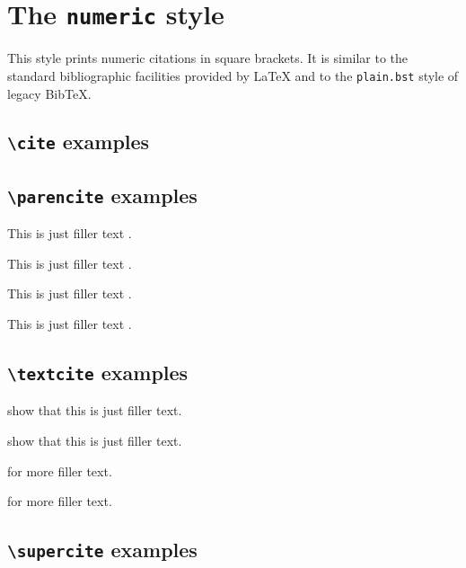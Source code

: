 \documentclass[a4paper]{article}
\newcommand{\cmd}[1]{\texttt{\textbackslash #1}}
\begin{document}
\section*{The \texttt{numeric} style}

This style prints numeric citations in square brackets. It is
similar to the standard bibliographic facilities provided by LaTeX
and to the \texttt{plain.bst} style of legacy BibTeX.

\subsection*{\cmd{cite} examples}

\cite{companion}

\cite[59]{companion}

\cite[See][]{companion}

\cite[See][59--63]{companion}

\subsection*{\cmd{parencite} examples}


This is just filler text \parencite{companion}.

This is just filler text \parencite[59]{companion}.

This is just filler text \parencite[See][]{companion}.

This is just filler text \parencite[See][59--63]{companion}.

\subsection*{\cmd{textcite} examples}


\textcite{companion} show that this is just filler text.

\textcite[59]{companion} show that this is just filler text.

\textcite[See][]{companion} for more filler text.

\textcite[See][59--63]{companion} for more filler text.

\subsection*{\cmd{supercite} examples}
\end{document}

